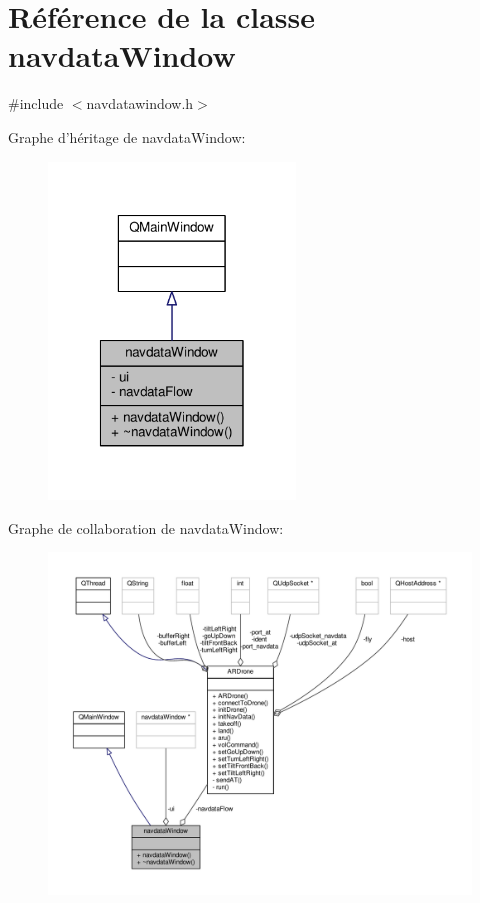 \hypertarget{classnavdata_window}{\section{Référence de la classe navdata\-Window}
\label{classnavdata_window}
}


{\ttfamily \#include $<$navdatawindow.\-h$>$}



Graphe d'héritage de navdata\-Window\-:
\nopagebreak
\begin{figure}[H]
\begin{center}
\leavevmode
\includegraphics[width=186pt]{classnavdata_window__inherit__graph}
\end{center}
\end{figure}


Graphe de collaboration de navdata\-Window\-:
\nopagebreak
\begin{figure}[H]
\begin{center}
\leavevmode
\includegraphics[width=350pt]{classnavdata_window__coll__graph}
\end{center}
\end{figure}
